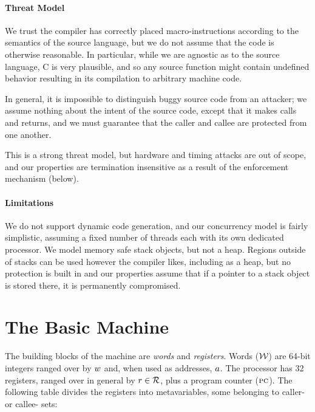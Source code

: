 \documentclass[10pt,conference]{ieeetran}%
\theoremstyle{definition}
\begin{document}
\paragraph*{Threat Model}

We trust the compiler has correctly placed macro-instructions according to
the semantics of the source language, but we do not assume that the code
is otherwise reasonable. In particular, while we are agnostic as to the source
language, C is very plausible, and so any source function might contain undefined
behavior resulting in its compilation to arbitrary machine code.

In general, it is impossible to distinguish buggy source code from an attacker;
we assume nothing about the intent of the source code, except that it makes calls
and returns, and we must guarantee that the caller and callee are protected from one
another.

This is a strong threat model, but hardware and timing attacks are out of scope,
and our properties are termination insensitive as a result of the enforcement mechanism
(below).

\paragraph*{Limitations}

We do not support dynamic code generation, and our concurrency model is fairly
simplistic, assuming a fixed number of threads each with its own dedicated processor.
We model memory safe stack objects, but not a heap. Regions outside of
stacks can be used however the compiler likes, including as a heap, but no protection is
built in and our properties assume that if a pointer to a stack object is stored there,
it is permanently compromised.

\section{The Basic Machine}

The building blocks of the machine are {\em words} and {\em registers}.
Words (\({\mathcal W}\)) are 64-bit integers ranged over by \(w\) and, when used as addresses,
\(a\). The processor has 32 registers, ranged over in general by \(r \in {\mathcal R}\),
plus a program counter (\(\textsc{pc}\)). The following table divides
the registers into metavariables, some belonging to caller- or callee- sets:
\end{document}

